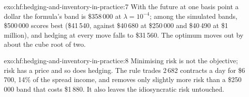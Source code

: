 \begin{solution}{exo:hf:hedging-and-inventory-in-practice:7}
With the future at one basis point a dollar the formula's band is \$358\,000 at $\lambda=10^{-4}$; among the simulated bands, \$500\,000 scores best
(\$41\,540, against \$40\,680 at \$250\,000 and \$40\,490 at \$1 million), and hedging at every move falls to \$31\,560. The optimum moves out by about the
cube root of two.
\end{solution}

\begin{solution}{exo:hf:hedging-and-inventory-in-practice:8}
Minimising risk is not the objective; risk has a price and so does hedging. The rule trades 2\,682 contracts a day for \$6\,700, 14\% of the spread
income, and removes only slightly more risk than a \$250\,000 band that costs \$1\,880. It also leaves the idiosyncratic risk untouched.
\end{solution}

